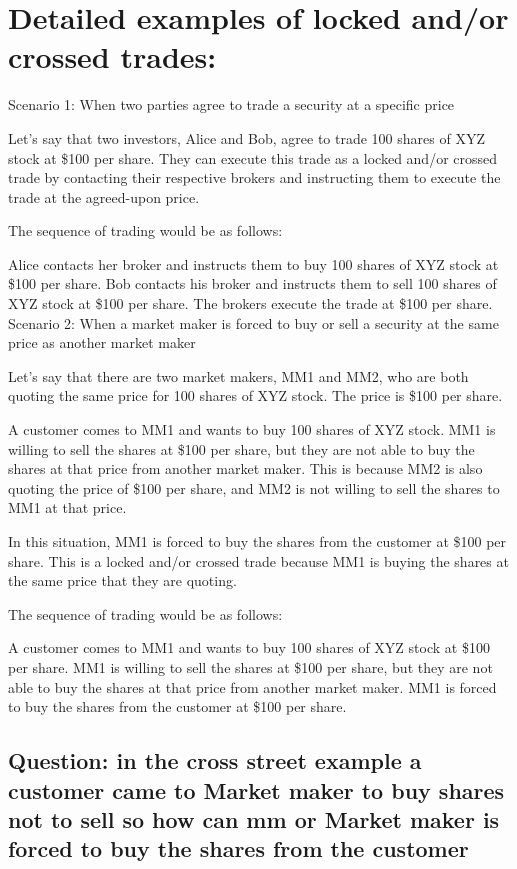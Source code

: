 \documentclass[11pt]{article}
\begin{document}
\section{Detailed examples of locked and/or crossed trades:}
\label{sec:orgd2d7048}

Scenario 1: When two parties agree to trade a security at a specific price

Let's say that two investors, Alice and Bob, agree to trade 100 shares of XYZ stock at \$100 per share. They can execute this trade as a locked and/or crossed trade by contacting their respective brokers and instructing them to execute the trade at the agreed-upon price.

The sequence of trading would be as follows:

Alice contacts her broker and instructs them to buy 100 shares of XYZ stock at \$100 per share.
Bob contacts his broker and instructs them to sell 100 shares of XYZ stock at \$100 per share.
The brokers execute the trade at \$100 per share.
Scenario 2: When a market maker is forced to buy or sell a security at the same price as another market maker

Let's say that there are two market makers, MM1 and MM2, who are both quoting the same price for 100 shares of XYZ stock. The price is \$100 per share.

A customer comes to MM1 and wants to buy 100 shares of XYZ stock. MM1 is willing to sell the shares at \$100 per share, but they are not able to buy the shares at that price from another market maker. This is because MM2 is also quoting the price of \$100 per share, and MM2 is not willing to sell the shares to MM1 at that price.

In this situation, MM1 is forced to buy the shares from the customer at \$100 per share. This is a locked and/or crossed trade because MM1 is buying the shares at the same price that they are quoting.

The sequence of trading would be as follows:

A customer comes to MM1 and wants to buy 100 shares of XYZ stock at \$100 per share.
MM1 is willing to sell the shares at \$100 per share, but they are not able to buy the shares at that price from another market maker.
MM1 is forced to buy the shares from the customer at \$100 per share.

\subsection{Question: in the cross street example a customer came to Market maker to buy shares not to sell so how can mm or Market maker is forced to buy the shares from the customer}
\label{sec:org2679f64}
\end{document}

